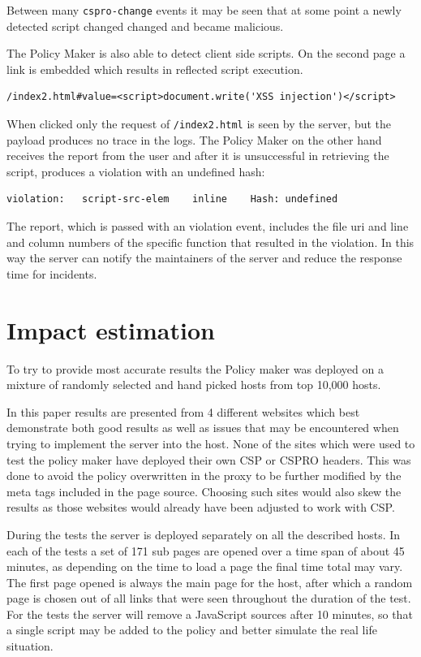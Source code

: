 Between many \texttt{cspro-change} events it may be seen that at some point a newly detected script changed changed and became malicious.

The Policy Maker is also able to detect client side scripts.
On the second page a link is embedded which results in reflected script execution.
\begin{verbatim}
/index2.html#value=<script>document.write('XSS injection')</script>
\end{verbatim}
When clicked only the request of \texttt{/index2.html} is seen by the server, but the payload produces no trace in the logs.
The Policy Maker on the other hand receives the report from the user and after it is unsuccessful in retrieving the script, produces a violation with an undefined hash:
\begin{verbatim}
violation:   script-src-elem    inline    Hash: undefined
\end{verbatim}
The report, which is passed with an violation event, includes the file uri and line and column numbers of the specific function that resulted in the violation.
In this way the server can notify the maintainers of the server and reduce the response time for incidents.

\section{Impact estimation}

To try to provide most accurate results the Policy maker was deployed on a mixture of randomly selected and hand picked hosts from top 10,000 hosts.

In this paper results are presented from 4 different websites which best demonstrate both good results as well as issues that may be encountered when trying to implement the server into the host.
None of the sites which were used to test the policy maker have deployed their own CSP or CSPRO headers.
This was done to avoid the policy overwritten in the proxy to be further modified by the meta tags included in the page source.
Choosing such sites would also skew the results as those websites would already have been adjusted to work with CSP.

During the tests the server is deployed separately on all the described hosts.
In each of the tests a set of 171 sub pages are opened over a time span of about 45 minutes, as depending on the time to load a page the final time total may vary. 
The first page opened is always the main page for the host, after which a random page is chosen out of all links that were seen throughout the duration of the test.
For the tests the server will remove a JavaScript sources after 10 minutes, so that a single script may be added to the policy and better simulate the real life situation.

